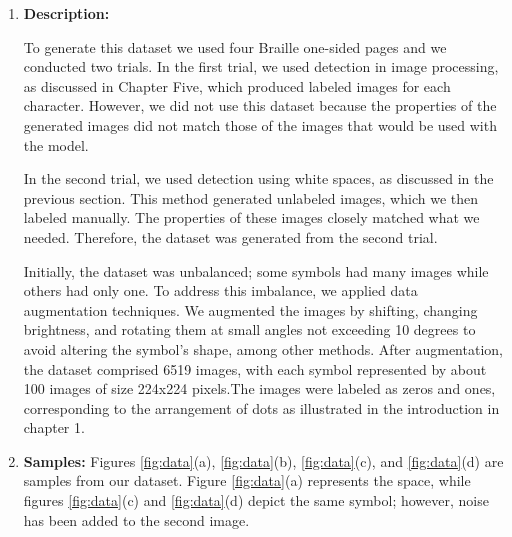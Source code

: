 \begin{enumerate}
    \item \textbf{Description:} 

    To generate this dataset we used four Braille one-sided pages and we conducted two trials. In the first trial, we used detection in image processing, as discussed in Chapter Five, which produced labeled images for each character. However, we did not use this dataset because the properties of the generated images did not match those of the images that would be used with the model.
    
    In the second trial, we used detection using white spaces, as discussed in the previous section. This method generated unlabeled images, which we then labeled manually. The properties of these images closely matched what we needed. Therefore, the dataset was generated from the second trial.

    
    Initially, the dataset was unbalanced; some symbols had many images while others had only one. To address this imbalance, we applied data augmentation techniques. We augmented the images by shifting, changing brightness, and rotating them at small angles not exceeding 10 degrees to avoid altering the symbol’s shape, among other methods. After augmentation, the dataset comprised 6519 images, with each symbol represented by about 100 images of size 224x224 pixels.The images were labeled as zeros and ones, corresponding to the arrangement of dots as illustrated in the introduction in chapter 1.
        
    \item \textbf{Samples:}
Figures \ref{fig:data}(a), \ref{fig:data}(b), \ref{fig:data}(c), and \ref{fig:data}(d) are samples from our dataset. Figure \ref{fig:data}(a) represents the space, while figures \ref{fig:data}(c) and \ref{fig:data}(d) depict the same symbol; however, noise has been added to the second image.


\end{enumerate}

